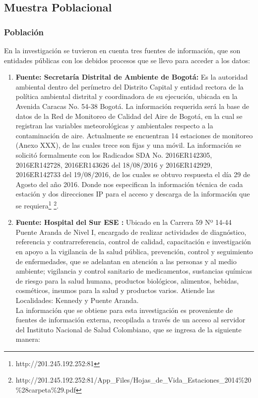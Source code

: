 \documentclass[a4paper,openright,12pt]{book}
\theoremstyle{definition}
\theoremstyle{remark}
\begin{document}
	\subsection{Muestra Poblacional}
    	\subsubsection{Población}
        En la investigación se tuvieron en cuenta tres fuentes de información, que son entidades públicas con los debidos procesos que se llevo para acceder a los datos:\\

\begin{enumerate}
	\item \textbf{Fuente: Secretaría Distrital de Ambiente de Bogotá:} Es la autoridad ambiental dentro del perímetro del Distrito Capital y entidad rectora de la política ambiental distrital y coordinadora de su ejecución, ubicada en la Avenida Caracas No. 54-38 Bogotá. La información requerida será la base de datos de la Red de Monitoreo de Calidad del Aire de Bogotá, en la cual se registran las variables meteorológicas y ambientales respecto a la contaminación de aire. Actualmente se encuentran 14 estaciones de monitoreo (Anexo XXX), de las cuales trece son fijas y una móvil. La información se solicitó formalmente con los Radicados SDA No. 2016ER142305, 2016ER142728, 2016ER143626 del 18/08/2016 y 2016ER142929, 2016ER142733 del 19/08/2016, de los cuales  se obtuvo respuesta el día 29 de Agosto del año 2016. Donde nos especifican la información técnica de cada estación y dos direcciones IP para el acceso y descarga de la información que se requiera\footnote{http://201.245.192.252:81} \footnote{http://201.245.192.252:81/App\_Files/Hojas\_de\_Vida\_Estaciones\_2014\%20\%28carpeta\%29.pdf}.
    \item \textbf{Fuente: Hospital del Sur ESE :} Ubicado en la Carrera 59 Nº 14-44 Puente Aranda de Nivel I, encargado de realizar actividades de diagnóstico, referencia y contrarreferencia, control de calidad, capacitación e investigación en apoyo a la vigilancia de la salud pública, prevención, control y seguimiento de enfermedades, que se adelantan en atención a las personas y al medio ambiente; vigilancia y control sanitario de medicamentos, sustancias químicas de riesgo para la salud humana, productos biológicos, alimentos, bebidas, cosméticos, insumos para la salud y productos varios. Atiende las Localidades: Kennedy y Puente Aranda.\\
La información  que se  obtiene para esta investigación es proveniente de fuentes de información externa, recopilada a través de un acceso al servidor del Instituto Nacional de Salud Colombiano, que se ingresa de la siguiente manera:

\end{enumerate}
\end{document}
